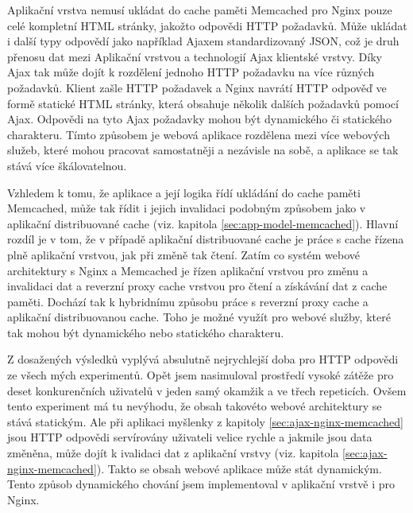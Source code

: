 \documentclass[12pt]{article}
\begin{document}
\obrazek
{}

\label{sec:ajax-nginx-memcached}
Aplikační vrstva nemusí ukládat do cache paměti Memcached pro Nginx pouze celé kompletní HTML stránky, jakožto odpovědi HTTP požadavků. Může ukládat i další typy odpovědí jako například Ajaxem standardizovaný JSON, což je druh přenosu dat mezi Aplikační vrstvou a technologií Ajax klientské vrstvy. Díky Ajax tak může dojít k rozdělení jednoho HTTP požadavku na více různých požadavků. Klient zašle HTTP požadavek a Nginx navrátí HTTP odpověď ve formě statické HTML stránky, která obsahuje několik dalších požadavků pomocí Ajax. Odpovědi na tyto Ajax požadavky mohou být dynamického či statického charakteru. Tímto způsobem je webová aplikace rozdělena mezi více webových služeb, které mohou pracovat samostatněji a nezávisle na sobě, a aplikace se tak stává více škálovatelnou.

Vzhledem k tomu, že aplikace a její logika řídí ukládání do cache paměti Memcached, může tak řídit i jejich invalidaci podobným způsobem jako v aplikační distribuované cache (viz. kapitola \ref{sec:app-model-memcached}). Hlavní rozdíl je v tom, že v případě aplikační distribuované cache je práce s cache řízena plně aplikační vrstvou, jak při změně tak čtení. Zatím co systém webové architektury s Nginx a Memcached je řízen aplikační vrstvou pro změnu a invalidaci dat a reverzní proxy cache vrstvou pro čtení a získávání dat z cache paměti. Dochází tak k hybridnímu způsobu práce s reverzní proxy cache a aplikační distribuovanou cache. Toho je možné využít pro webové služby, které tak mohou být dynamického nebo statického charakteru.

Z dosažených výsledků vyplývá absulutně nejrychlejší doba pro HTTP odpovědi ze všech mých experimentů. Opět jsem nasimuloval prostředí vysoké zátěže pro deset konkurenčních uživatelů v jeden samý okamžik a ve třech repeticích. Ovšem tento experiment má tu nevýhodu, že obsah takovéto webové architektury se stává statickým. Ale při aplikaci myšlenky z kapitoly \ref{sec:ajax-nginx-memcached} jsou HTTP odpovědi servírovány uživateli velice rychle a jakmile jsou data změněna, může dojít k ivalidaci dat z aplikační vrstvy (viz. kapitola \ref{sec:ajax-nginx-memcached}). Takto se obsah webové aplikace může stát dynamickým. Tento způsob dynamického chování jsem implementoval v aplikační vrstvě i pro Nginx.
\end{document}
